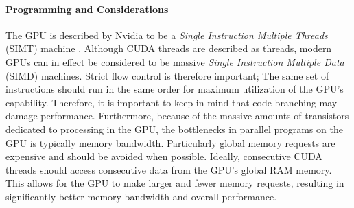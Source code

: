 \paragraph{Programming and Considerations}
The GPU is described by Nvidia to be a \textit{Single Instruction Multiple Threads} (SIMT) machine \cite{cuda}.
Although CUDA threads are described as threads, modern GPUs can in effect be considered to be massive \textit{Single Instruction Multiple Data} (SIMD) machines. 
Strict flow control is therefore important; 
The same set of instructions should run in the same order for maximum utilization of the GPU's capability.
Therefore, it is important to keep in mind that code branching may damage performance.
Furthermore, because of the massive amounts of transistors dedicated to processing in the GPU, the bottlenecks in parallel programs on the GPU is typically memory bandwidth.
Particularly global memory requests are expensive and should be avoided when possible.
Ideally, consecutive CUDA threads should access consecutive data from the GPU's global RAM memory.
This allows for the GPU to make larger and fewer memory requests, resulting in significantly better memory bandwidth and overall performance.
